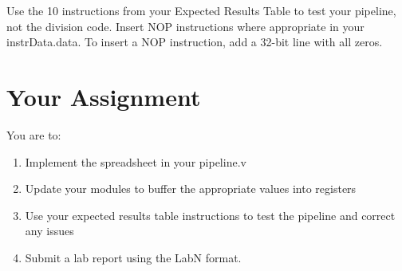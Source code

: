 Use the 10 instructions from your Expected Results Table to test your pipeline, not the division code.  Insert NOP instructions where appropriate in your instrData.data.  To insert a NOP instruction, add a 32-bit line with all zeros.

\section{Your Assignment}

You are to:
\begin{enumerate}
\item Implement the spreadsheet in your pipeline.v
\item Update your modules to buffer the appropriate values into registers
\item Use your expected results table instructions to test the pipeline and correct any issues
\item Submit a lab report using the LabN format.
\end{enumerate} 